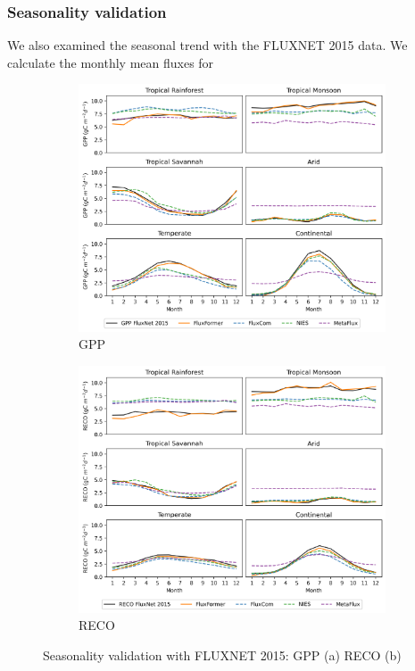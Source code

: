 \subsubsection*{Seasonality validation}
We also examined the seasonal trend with the FLUXNET 2015 data. We calculate the monthly mean fluxes for 
\begin{figure}[p]
    \centering
    \begin{subfigure}{\textwidth}
      \centering
      \includegraphics[width=.8\textwidth]{figs/chap6/seasonal_fluxnet_GPP.png}
      \caption{GPP}
      \label{fig:chap6_fig4a}
    \end{subfigure}

    \begin{subfigure}{\textwidth}
      \centering
      \includegraphics[width=.8\textwidth]{figs/chap6/seasonal_fluxnet_RECO.png}
      \caption{RECO}
      \label{fig:chap6_fig4b}
    \end{subfigure}
    \caption[Seasonality validation with FLUXNET 2015]{Seasonality validation with FLUXNET 2015: GPP (a) RECO (b)}
    \label{fig:chap6_fig4}
\end{figure}

